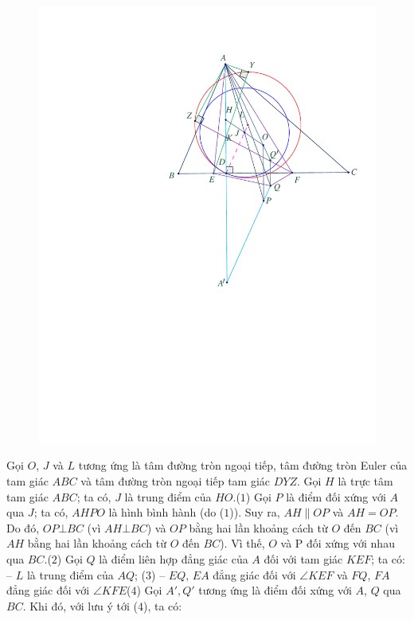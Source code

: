 \begin{multicols}{2}
\begin{figure}[H]
		\includegraphics[width= 1\linewidth]{P609}
		\vspace*{-20pt}
	\end{figure}
	Gọi $O$, $J$ và $L$ tương ứng là tâm đường tròn ngoại tiếp, tâm đường tròn Euler của tam giác $ABC$ và tâm đường tròn ngoại tiếp tam giác $DYZ$.
	\vskip 0.05cm
	Gọi $H$ là trực tâm tam giác $ABC$; ta có, $J$ là trung điểm của $HO$.\hfill       ($1$)
	\vskip 0.05cm
	Gọi $P$ là điểm đối xứng với $A$ qua $J$; ta có, $AHPO$ là hình bình hành (do ($1$)). Suy ra, $AH \parallel OP$ và $AH = OP$. Do đó, $OP \bot BC$ (vì $AH \bot BC$) và $OP$ bằng hai lần khoảng cách từ $O$ đến $BC$ (vì $AH$ bằng hai lần khoảng cách từ $O$ đến $BC$). Vì thế, $O$ và P đối xứng với nhau qua $BC$.\hfill              ($2$)
	\vskip 0.05cm
	Gọi $Q$ là điểm liên hợp đẳng giác của $A$ đối với tam giác $KEF$; ta có:
	\vskip 0.05cm
	-- $L$ là trung điểm của $AQ$; \hfill ($3$)
	\vskip 0.05cm
	-- $EQ$, $EA$ đẳng giác đối với $\angle KEF$ và $FQ$, $FA$ đẳng giác đối với      $\angle KFE$\hfill    ($4$)
	\vskip 0.05cm
	Gọi  $A',Q'$ tương ứng là điểm đối xứng với $A$, $Q$ qua $BC$. Khi đó, với lưu ý tới ($4$), ta có:

\end{multicols}
